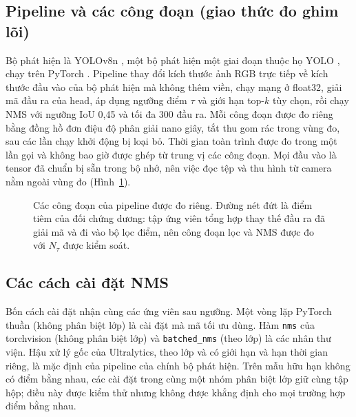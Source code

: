 \documentclass[12pt,a4paper]{article}
\newcommand{\Ntau}{N_{\tau}}
\begin{document}
\subsection{Pipeline và các công đoạn (giao thức đo ghim lõi)}
Bộ phát hiện là YOLOv8n \cite{jocher2023ultralytics}, một bộ phát hiện một giai đoạn thuộc họ YOLO \cite{redmon2016yolo}, chạy trên PyTorch \cite{paszke2019pytorch}. Pipeline thay đổi kích thước ảnh RGB trực tiếp về kích thước đầu vào của bộ phát hiện mà không thêm viền, chạy mạng ở float32, giải mã đầu ra của head, áp dụng ngưỡng điểm $\tau$ và giới hạn top-$k$ tùy chọn, rồi chạy NMS với ngưỡng IoU 0,45 và tối đa 300 đầu ra. Mỗi công đoạn được đo riêng bằng đồng hồ đơn điệu độ phân giải nano giây, tắt thu gom rác trong vùng đo, sau các lần chạy khởi động bị loại bỏ. Thời gian toàn trình được đo trong một lần gọi và không bao giờ được ghép từ trung vị các công đoạn. Mọi đầu vào là tensor đã chuẩn bị sẵn trong bộ nhớ, nên việc đọc tệp và thu hình từ camera nằm ngoài vùng đo (Hình~\ref{fig:pipeline}).

\begin{figure}[t]
\centering
{}
\caption{Các công đoạn của pipeline được đo riêng. Đường nét đứt là điểm tiêm của đối chứng dương: tập ứng viên tổng hợp thay thế đầu ra đã giải mã và đi vào bộ lọc điểm, nên công đoạn lọc và NMS được đo với $\Ntau$ được kiểm soát.}
\label{fig:pipeline}
\end{figure}

\subsection{Các cách cài đặt NMS}
Bốn cách cài đặt nhận cùng các ứng viên sau ngưỡng. Một vòng lặp PyTorch thuần (không phân biệt lớp) là cài đặt mà mã tối ưu dùng. Hàm \texttt{nms} của torchvision (không phân biệt lớp) và \texttt{batched\_nms} (theo lớp) là các nhân thư viện. Hậu xử lý gốc của Ultralytics, theo lớp và có giới hạn và hạn thời gian riêng, là mặc định của pipeline của chính bộ phát hiện. Trên mẫu hữu hạn không có điểm bằng nhau, các cài đặt trong cùng một nhóm phân biệt lớp giữ cùng tập hộp; điều này được kiểm thử nhưng không được khẳng định cho mọi trường hợp điểm bằng nhau.
\end{document}
